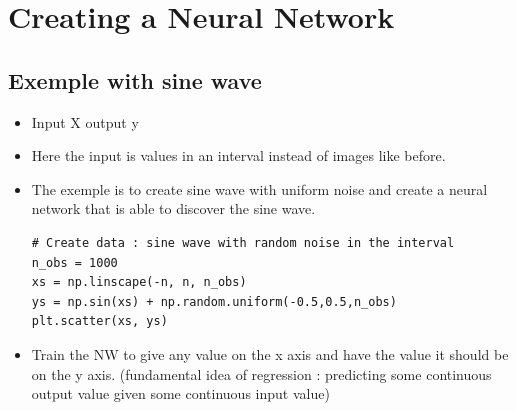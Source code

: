 \documentclass[12pt,a4paper]{article}
\begin{document}
\section{Creating a Neural Network}
\subsection{Exemple with sine wave}
\begin{itemize}
\item Input X output y
\item Here the input is values in an interval instead of images like before.
\item The exemple is to create sine wave with uniform noise and create a neural network that is able to discover the sine wave.
\begin{lstlisting}
# Create data : sine wave with random noise in the interval
n_obs = 1000
xs = np.linscape(-n, n, n_obs)
ys = np.sin(xs) + np.random.uniform(-0.5,0.5,n_obs)
plt.scatter(xs, ys)
\end{lstlisting}
\item Train the NW to give any value on the x axis and have the value it should be on the y axis. (fundamental idea of regression : predicting some continuous output value given some continuous input value)
\end{itemize}
\end{document}
